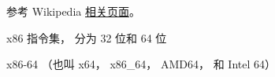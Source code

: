 
\begin{issues}
\issueDraft
\end{issues}

参考 Wikipedia \href{https://en.wikipedia.org/wiki/X86-64}{相关页面}。

x86 指令集， 分为 32 位和 64 位

x86-64 （也叫 x64， x86_64， AMD64， 和 Intel 64）

